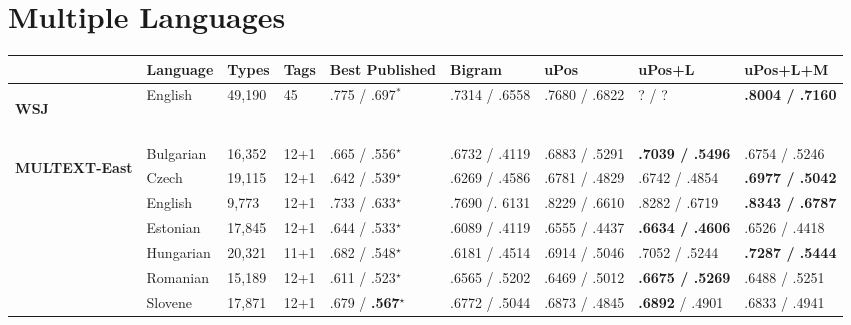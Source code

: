 \section{Multiple Languages}
\begin{table}[h]
  \small
  \begin{flushleft}
  \begin{tabular}{|l|l|l|l|l|l|l|l|l|}
        \hline
        & Language   & Types   & Tags & Best Published            & Bigram &uPos           & uPos+L            & uPos+L+M     \\ \hline %
        \multirow{1}{*}{\begin{sideways}\textbf{WSJ}\end{sideways}} 
        & English    & 49,190  & 45 & .775 / .697$^*$  &.7314 / .6558 & .7680 / .6822 & ? / ? & \textbf{.8004 / .7160}           \\
        & & & & & & & &\\ \hline
        \multirow{8}{*}{\begin{sideways}\textbf{MULTEXT-East}\end{sideways}} & 
        Bulgarian    & 16,352  & 12+1 & .665 / .556$^\star$    & .6732 / .4119 & .6883 / .5291 & \textbf{.7039 / .5496}     & .6754 / .5246 \\
        & Czech      & 19,115  & 12+1 & .642 / .539$^\star$    & .6269 / .4586 & .6781 / .4829 & .6742 / .4854     & \textbf{.6977 / .5042} \\
        & English    & 9,773   & 12+1 & .733 / .633$^\star$    & .7690 /. 6131 & .8229 / .6610 & .8282 / .6719     & \textbf{.8343 / .6787} \\
        & Estonian   & 17,845  & 12+1 & .644 / .533$^\star$    & .6089 / .4119 & .6555 / .4437 & \textbf{.6634 / .4606}     & .6526 / .4418 \\
        & Hungarian  & 20,321  & 11+1 & .682 / .548$^\star$    & .6181 / .4514 & .6914 / .5046 & .7052 / .5244     & \textbf{.7287 / .5444} \\
        & Romanian   & 15,189  & 12+1 & .611 / .523$^\star$    & .6565 / .5202 & .6469 / .5012 & \textbf{.6675 / .5269}     & .6488 / .5251 \\
        & Slovene    & 17,871  & 12+1 & .679 / \textbf{.567$^\star$}    & .6772 / .5044 & .6873 / .4845 & \textbf{.6892} / .4901     & .6833 / .4941 \\

\end{tabular}
\end{flushleft}
\end{table}
